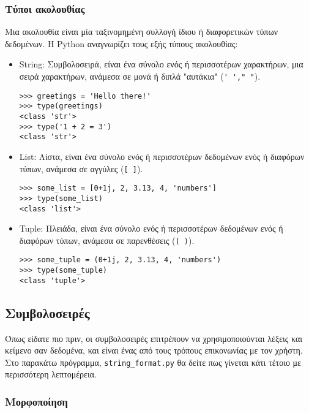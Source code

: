 \documentclass[12pt]{extreport}
\begin{document}
\subsubsection{Τύποι ακολουθίας}

Μια ακολουθία είναι μία ταξινομημένη συλλογή ίδιου ή διαφορετικών τύπων δεδομένων. Η Python αναγνωρίζει τους εξής τύπους ακολουθίας:

\begin{itemize}
    \item String: Συμβολοσειρά, είναι ένα σύνολο ενός ή περισσοτέρων χαρακτήρων, μια σειρά χαρακτήρων, ανάμεσα σε μονά ή διπλά "αυτάκια" (\lstinline[language={}]{' '," "}).
          \begin{lstlisting}[numbers=none]
>>> greetings = 'Hello there!'
>>> type(greetings)
<class 'str'>
>>> type('1 + 2 = 3')
<class 'str'>
\end{lstlisting}
    \item List: Λίστα, είναι ένα σύνολο ενός ή περισσοτέρων δεδομένων ενός ή διαφόρων τύπων, ανάμεσα σε αγγύλες (\lstinline[language={}]{[ ]}).
          \begin{lstlisting}[numbers=none]
>>> some_list = [0+1j, 2, 3.13, 4, 'numbers']
>>> type(some_list)
<class 'list'>    
\end{lstlisting}
    \item Tuple: Πλειάδα, είναι ένα σύνολο ενός ή περισσοτέρων δεδομένων ενός ή διαφόρων τύπων, ανάμεσα σε παρενθέσεις (\lstinline[language={}]{( )}).
          \begin{lstlisting}[numbers=none]
>>> some_tuple = (0+1j, 2, 3.13, 4, 'numbers')
>>> type(some_tuple)
<class 'tuple'>    
\end{lstlisting}
\end{itemize}

\subsection{Συμβολοσειρές}

Όπως είδατε πιο πριν, οι συμβολοσειρές επιτρέπουν να χρησιμοποιούνται λέξεις και κείμενο σαν δεδομένα, και είναι ένας από τους τρόπους επικονωνίας με τον χρήστη. Στο παρακάτω πρόγραμμα, \lstinline{string_format.py} θα δείτε πως γίνεται κάτι τέτοιο με περισσότερη λεπτομέρεια.

\subsubsection{Μορφοποίηση}
\end{document}
